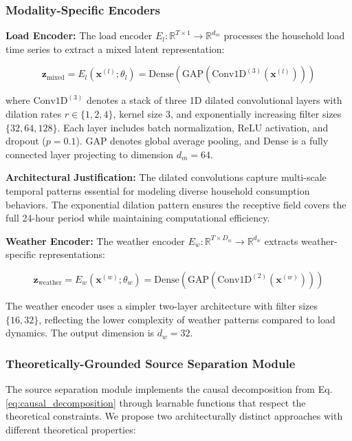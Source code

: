 \documentclass[journal]{IEEEtran}
\begin{document}
\subsubsection{Modality-Specific Encoders}

\textbf{Load Encoder:} The load encoder $E_l: \mathbb{R}^{T \times 1} \rightarrow \mathbb{R}^{d_m}$ processes the household load time series to extract a mixed latent representation:

\begin{equation}
\mathbf{z}_{\text{mixed}} = E_l(\mathbf{x}^{(l)}; \theta_l) = \text{Dense}(\text{GAP}(\text{Conv1D}^{(3)}(\mathbf{x}^{(l)})))
\label{eq:load_encoder}
\end{equation}

where $\text{Conv1D}^{(3)}$ denotes a stack of three 1D dilated convolutional layers with dilation rates $r \in \{1, 2, 4\}$, kernel size 3, and exponentially increasing filter sizes $\{32, 64, 128\}$. Each layer includes batch normalization, ReLU activation, and dropout ($p=0.1$). $\text{GAP}$ denotes global average pooling, and $\text{Dense}$ is a fully connected layer projecting to dimension $d_m = 64$.

\textbf{Architectural Justification:} The dilated convolutions capture multi-scale temporal patterns essential for modeling diverse household consumption behaviors. The exponential dilation pattern ensures the receptive field covers the full 24-hour period while maintaining computational efficiency.

\textbf{Weather Encoder:} The weather encoder $E_w: \mathbb{R}^{T \times D_w} \rightarrow \mathbb{R}^{d_w}$ extracts weather-specific representations:

\begin{equation}
\mathbf{z}_{\text{weather}} = E_w(\mathbf{x}^{(w)}; \theta_w) = \text{Dense}(\text{GAP}(\text{Conv1D}^{(2)}(\mathbf{x}^{(w)})))
\label{eq:weather_encoder}
\end{equation}

The weather encoder uses a simpler two-layer architecture with filter sizes $\{16, 32\}$, reflecting the lower complexity of weather patterns compared to load dynamics. The output dimension is $d_w = 32$.

\subsubsection{Theoretically-Grounded Source Separation Module}

The source separation module implements the causal decomposition from Eq. \ref{eq:causal_decomposition} through learnable functions that respect the theoretical constraints. We propose two architecturally distinct approaches with different theoretical properties:
\end{document}
